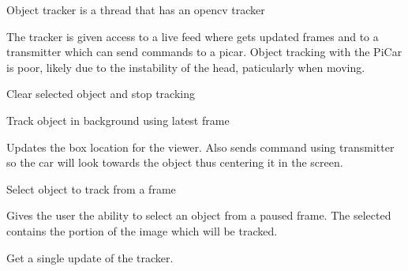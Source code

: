 \documentclass[letterpaper,10pt,english]{sphinxmanual}
\begin{document}
\begin{fulllineitems}
\label{\detokenize{index:client.ObjectTracker}}
Object tracker is a thread that has an opencv tracker

The tracker is given access to a live feed where gets updated frames and to a transmitter which can send commands to a picar. Object tracking with the PiCar is poor, likely due to the instability of the head, paticularly when moving.

\begin{fulllineitems}
\label{\detokenize{index:client.ObjectTracker.deselect}}
Clear selected object and stop tracking

\end{fulllineitems}


\begin{fulllineitems}
\label{\detokenize{index:client.ObjectTracker.run}}
Track object in background using latest frame

Updates the box location for the viewer. Also sends command using transmitter so the car will look towards the object thus centering it in the screen.

\end{fulllineitems}


\begin{fulllineitems}
\label{\detokenize{index:client.ObjectTracker.select}}
Select object to track from a frame

Gives the user the ability to select an object from a paused frame.
The selected contains the portion of the image which will be tracked.

\end{fulllineitems}


\begin{fulllineitems}
\label{\detokenize{index:client.ObjectTracker.track}}
Get a single update of the tracker.

\end{fulllineitems}


\end{fulllineitems}
\end{document}
